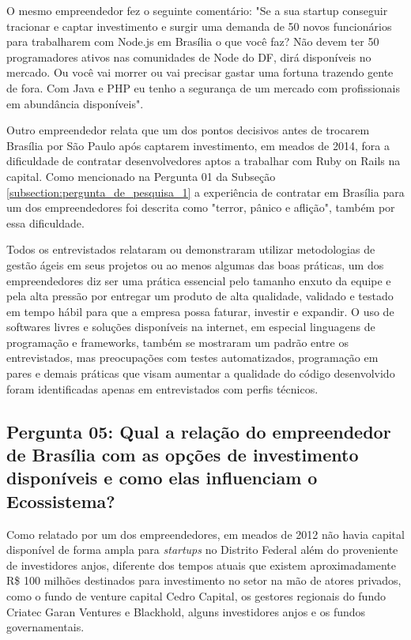 O mesmo empreendedor fez o seguinte comentário: "Se a sua startup conseguir tracionar e captar investimento e surgir uma demanda de 50 novos funcionários para trabalharem com Node.js em Brasília o que você faz? Não devem ter 50 programadores ativos nas comunidades de Node do DF, dirá disponíveis no mercado. Ou você vai morrer ou vai precisar gastar uma fortuna trazendo gente de fora. Com Java e PHP eu tenho a segurança de um mercado com profissionais em abundância disponíveis".

Outro empreendedor relata que um dos pontos decisivos antes de trocarem Brasília por São Paulo após captarem investimento, em meados de 2014, fora a dificuldade de contratar desenvolvedores aptos a trabalhar com Ruby on Rails na capital. Como mencionado na Pergunta 01 da Subseção \ref{subsection:pergunta_de_pesquisa_1} a experiência de contratar em Brasília para um dos empreendedores foi descrita como "terror, pânico e aflição", também por essa dificuldade.

Todos os entrevistados relataram ou demonstraram utilizar metodologias de gestão ágeis em seus projetos ou ao menos algumas das boas práticas, um dos empreendedores diz ser uma prática essencial pelo tamanho enxuto da equipe e pela alta pressão por entregar um produto de alta qualidade, validado e testado em tempo hábil para que a empresa possa faturar, investir e expandir. O uso de softwares livres e soluções disponíveis na internet, em especial linguagens de programação e frameworks, também se mostraram um padrão entre os entrevistados, mas preocupações com testes automatizados, programação em pares e demais práticas que visam aumentar a qualidade do código desenvolvido foram identificadas apenas em entrevistados com perfis técnicos.

\subsection*{Pergunta 05: Qual a relação do empreendedor de Brasília com as opções de investimento disponíveis e como elas influenciam o Ecossistema?}
\label{subsection:pergunta_de_pesquisa_5}

Como relatado por um dos empreendedores, em meados de 2012 não havia capital disponível de forma ampla para \textit{startups} no Distrito Federal além do proveniente de investidores anjos, diferente dos tempos atuais que existem aproximadamente R\$ 100 milhões destinados para investimento no setor na mão de atores privados, como o fundo de venture capital Cedro Capital, os gestores regionais do fundo Criatec Garan Ventures e Blackhold, alguns investidores anjos e os fundos governamentais. 

